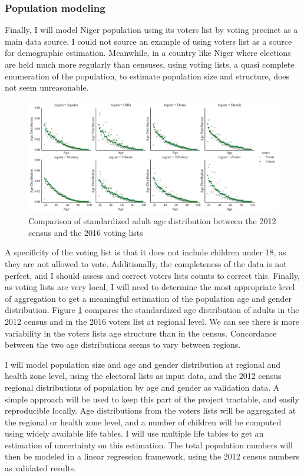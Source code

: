 \subsubsection{Population modeling}

Finally, I will model Niger population using its voters list by voting precinct as a main data source. I could not source an example of using voters list as a source for demographic estimation. Meanwhile, in a country like Niger where elections are held much more regularly than censuses, using voting lists, a quasi complete enumeration of the population, to estimate population size and structure, does not seem unreasonable.

\begin{figure}[ht]
	\begin{center}
		\includegraphics[width=\textwidth]{figure/age_structure_comparison.pdf}
		\caption{Comparison of standardized adult age distribution between the 2012 census and the 2016 voting lists}
		\label{fig:age_comparison}
	\end{center}
\end{figure}

A specificity of the voting list is that it does not include children under 18, as they are not allowed to vote. Additionally, the completeness of the data is not perfect, and I should assess and correct voters lists counts to correct this. Finally, as voting lists are very local, I will need to determine the most appropriate level of aggregation to get a meaningful estimation of the population age and gender distribution. Figure \ref{fig:age_comparison} compares the standardized age distribution of adults in the 2012 census and in the 2016 voters list at regional level. We can see there is more variability in the voters lists age structure than in the census. Concordance between the two age distributions seems to vary between regions.

I will model population size and age and gender distribution at regional and health zone level, using the electoral lists as input data, and the 2012 census regional distributions of population by age and gender as validation data. A simple approach will be used to keep this part of the project tractable, and easily reproducible locally. Age distributions from the voters lists will be aggregated at the regional or health zone level, and a number of children will be computed using widely available life tables. I will use multiple life tables to get an estimation of uncertainty on this estimation. The total population numbers will then be modeled in a linear regression framework, using the 2012 census numbers as validated results.

